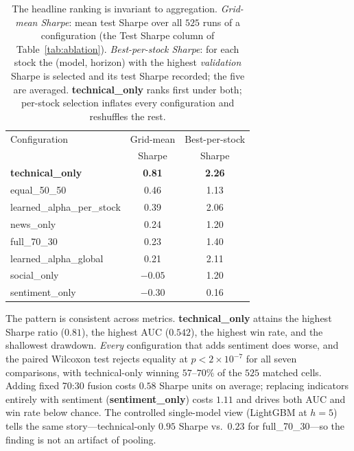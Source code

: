 \documentclass[conference]{IEEEtran}
\begin{document}
\begin{table}[t]
\caption{The headline ranking is invariant to aggregation. \emph{Grid-mean
Sharpe}: mean test Sharpe over all $525$ runs of a configuration (the Test
Sharpe column of Table~\ref{tab:ablation}). \emph{Best-per-stock Sharpe}: for
each stock the (model, horizon) with the highest \emph{validation} Sharpe is
selected and its test Sharpe recorded; the five are averaged.
\textbf{technical\_only} ranks first under both; per-stock selection inflates
every configuration and reshuffles the rest.}
\label{tab:aggviews}
\centering
\small
\setlength{\tabcolsep}{4pt}
\begin{tabular}{lcc}
\toprule
Configuration & Grid-mean & Best-per-stock \\
 & Sharpe & Sharpe \\
\midrule
\textbf{technical\_only}   & \textbf{0.81} & \textbf{2.26} \\
equal\_50\_50              & 0.46 & 1.13 \\
learned\_alpha\_per\_stock & 0.39 & 2.06 \\
news\_only                 & 0.24 & 1.20 \\
full\_70\_30               & 0.23 & 1.40 \\
learned\_alpha\_global     & 0.21 & 2.11 \\
social\_only               & $-0.05$ & 1.20 \\
sentiment\_only            & $-0.30$ & 0.16 \\
\bottomrule
\end{tabular}
\end{table}

The pattern is consistent across metrics. \textbf{technical\_only} attains the highest Sharpe
ratio ($0.81$), the highest AUC ($0.542$), the highest win rate, and the
shallowest drawdown. \emph{Every} configuration that adds sentiment does worse,
and the paired Wilcoxon test rejects
equality at $p<2\times10^{-7}$ for all seven comparisons, with technical-only winning
$57$--$70\%$ of the $525$ matched cells. Adding fixed 70:30 fusion costs $0.58$
Sharpe units on average; replacing indicators entirely with sentiment
(\textbf{sentiment\_only}) costs $1.11$ and drives both AUC and win rate below
chance. The controlled single-model view (LightGBM at $h=5$) tells the same
story---technical-only $0.95$ Sharpe vs.\ $0.23$ for full\_70\_30---so the
finding is not an artifact of pooling.
\end{document}
